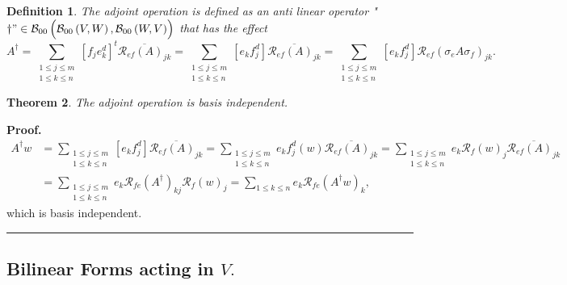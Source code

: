 \documentclass[aps,preprint]{revtex4}%
\newtheorem{theorem}{Theorem}
\newtheorem{definition}[theorem]{Definition}
\newenvironment{proof}[1][Proof]{\noindent\textbf{#1.} }{\ \rule{0.5em}{0.5em}}
\begin{document}
\begin{definition}
The adjoint operation is \emph{defined} as an anti linear operator
"$\dagger"\in\mathcal{B}_{00}\left(  \overset{}{\mathcal{B}_{00}\left(
V,W\right)  ,\mathcal{B}_{00}\left(  W,V\right)  }\right)  $ that has the
effect
\begin{equation}
A^{\dagger}=\sum_{\substack{1\leq j\leq m\\1\leq k\leq n}}\left[  f_{j}%
e_{k}^{d}\right]  ^{t}\overline{\mathcal{R}_{ef}\left(  A\right)  _{jk}}%
=\sum_{\substack{1\leq j\leq m\\1\leq k\leq n}}\left[  e_{k}f_{j}^{d}\right]
\overline{\mathcal{R}_{ef}\left(  A\right)  _{jk}}=\sum_{\substack{1\leq j\leq
m\\1\leq k\leq n}}\left[  e_{k}f_{j}^{d}\right]  \mathcal{R}_{ef}\left(
\sigma_{e}A\sigma_{f}\right)  _{jk}.
\end{equation}

\end{definition}

\begin{theorem}
The adjoint operation is basis independent.
\end{theorem}

\begin{proof}%
\begin{align}
A^{\dagger}w  &  =\sum_{\substack{1\leq j\leq m\\1\leq k\leq n}}\left[
e_{k}f_{j}^{d}\right]  \overline{\mathcal{R}_{ef}\left(  A\right)  _{jk}}%
=\sum_{\substack{1\leq j\leq m\\1\leq k\leq n}}e_{k}f_{j}^{d}\left(  w\right)
\overline{\mathcal{R}_{ef}\left(  A\right)  _{jk}}=\sum_{\substack{1\leq j\leq
m\\1\leq k\leq n}}e_{k}\mathcal{R}_{f}\left(  w\right)  _{j}\overline
{\mathcal{R}_{ef}\left(  A\right)  _{jk}}\\
&  =\sum_{\substack{1\leq j\leq m\\1\leq k\leq n}}e_{k}\mathcal{R}_{fe}\left(
A^{\dagger}\right)  _{kj}\mathcal{R}_{f}\left(  w\right)  _{j}=\sum_{1\leq
k\leq n}e_{k}\mathcal{R}_{fe}\left(  A^{\dagger}w\right)  _{k},
\end{align}
which is basis independent.
\end{proof}

\subsection{Bilinear Forms acting in $V.$}
\end{document}
